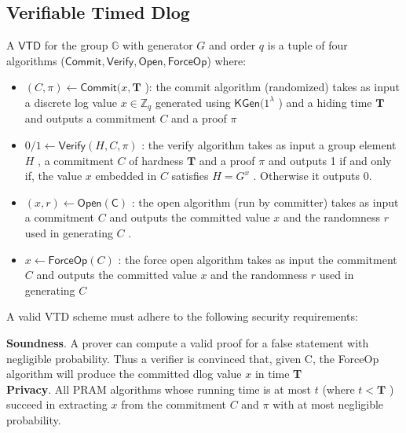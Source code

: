 \documentclass{article}      	%
\begin{document}
\subsection{Verifiable Timed Dlog}
A $\mathsf{VTD}$ for the group $\mathbb{G}$ with generator $G$ and order $q$ is a tuple of four algorithms ($\mathsf{Commit}, \mathsf{Verify}, \mathsf{Open}, \mathsf{ForceOp}$) where:
\begin{itemize}
	\item $(C, \pi) \gets \mathsf{Commit}(x, \textbf{T}$ ): the commit algorithm (randomized) takes as input a discrete log value $x \in \mathbb{Z}_q$ generated using $\mathsf{KGen}(1^{\lambda}$ ) and a hiding time $\textbf{T}$ and outputs a commitment $C$ and a proof $\pi$
	\item $0/1 \gets \mathsf{Verify}(H, C, \pi)$ : the verify algorithm takes as input a group element $H$ , a commitment $C$ of hardness $\textbf{T}$ and a proof $\pi$ and outputs 1 if and only if, the value $x$ embedded in $C$ satisfies $H = G^x$ . Otherwise it outputs 0.
	\item $(x, r) \gets \mathsf{Open(C)}$ : the open algorithm (run by committer) takes as input a commitment $C$ and outputs the committed value $x$ and the randomness $r$ used in generating $C$ .
	\item $x \gets \mathsf{ForceOp}(C)$ : the force open algorithm takes as input the commitment $C$ and outputs the committed value $x$ and the randomness $r$ used in generating $C$
\end{itemize}


A valid VTD scheme must adhere to the following security requirements:

\textbf{Soundness}. A prover can compute a valid proof for a false statement with negligible probability. Thus a verifier is convinced that, given C, the ForceOp algorithm will produce the committed dlog value $x$ in time \textbf{T} \\
\textbf{Privacy}. All PRAM algorithms whose running time is at most $t$ (where $t < \textbf{T}$ ) succeed in extracting $x$ from the commitment $C$ and $\pi$ with at most negligible probability. \\
\end{document}
